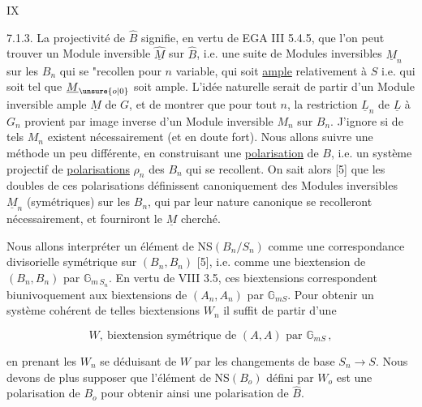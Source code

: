 
\hfill IX

7.1.3. La projectivité de $\hat B$ signifie, en vertu de EGA III 5.4.5, que l'on peut trouver un Module inversible $\underline{\hat M}$ sur $\hat B$, i.e. une suite de Modules inversibles $\underline M_n$ sur les $B_n$ qui se "recollen pour $n$ variable, qui soit \uline{ample} relativement à $S$ i.e. qui soit tel que $\underline M_{\unsure{o|0}}$ soit ample. L'idée naturelle serait de partir d'un Module inversible ample $\underline M$ de $G$, et de montrer que pour tout $n$, la restriction $\underline L_n$ de $\underline L$ à $G_n$ provient par image inverse d'un Module inversible $M_n$ sur $B_n$. J'ignore si de tels $M_n$ existent nécessairement (et en doute fort). Nous allons suivre une méthode un peu différente, en construisant une \uline{polarisation} de $B$, i.e. un système projectif de \uline{polarisations} $\rho_n$ des $B_n$ qui se recollent. On sait alors [5] que les doubles de ces polarisations définissent canoniquement des Modules inversibles $\underline M_n$ (symétriques) sur les $B_n$, qui par leur nature canonique se recolleront nécessairement, et fourniront le $\underline M$ cherché.

Nous allons interpréter un élément de $\mathrm{NS}(B_n/S_n)$ comme une correspondance divisorielle symétrique sur $(B_n,B_n)$ [5], i.e. comme une biextension de $(B_n,B_n)$ par $\mathbb G_{m\,S_n}$. En vertu de VIII 3.5, ces biextensions correspondent biunivoquement aux biextensions de $(A_n,A_n)$ par $\mathbb G_{mS}$. Pour obtenir un système cohérent de telles biextensions $W_n$ il suffit de partir d'une

\[
W,\ \text{biextension symétrique de }(A,A)\text{ par }\mathbb G_{mS}\,,\tag*{(7.1.4)}
\]

en prenant les $W_n$ se déduisant de $W$ par les changements de base $S_n\longrightarrow S$. Nous devons de plus supposer que l'élément de $\mathrm{NS}(B_o)$ défini par $W_o$ est une polarisation de $B_o$ pour obtenir ainsi une polarisation de $\hat B$.

